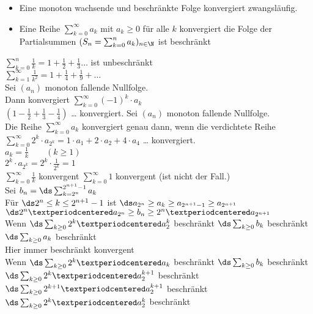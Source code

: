 
%
\begin{itemize}
    \item{Eine monoton wachsende und beschränkte Folge konvergiert zwangsläufig.}
    \item{Eine Reihe $\sum_{k=0}^{∞} a_k$ mit $a_k \geq 0$ für alle $k$ konvergiert \equ die Folge der Partialsummen $(S_n = \sum_{k=0}^{n} a_k)_{n \in \N}$ ist beschränkt}
\end{itemize}
%
\bsp
    $\sum_{k=0}^{n} \frac{1}{k} = 1 + \frac{1}{2} + \frac{1}{3} …$ ist unbeschränkt\\
\bsp
    $\sum_{k=1}^{\infty} \frac{1}{k^2} = 1 + \frac{1}{4} + \frac{1}{9}+…$\\
    Sei $(a_n)$ monoton fallende Nullfolge.\\
    Dann konvergiert $\sum_{k=0}^{∞} (-1)^k \cdot a_k$\\
\bsp
    $(1 - \frac{1}{2} + \frac{1}{3} - \frac{1}{4})$ … konvergiert.
Sei $(a_n)$ monoton fallende Nullfolge.\\
Die Reihe $\sum_{k=0}^{\infty} a_k$ konvergiert genau dann, wenn die verdichtete Reihe $\sum_{k=0}^{\infty} 2^k \cdot a_{2^k} = 1 · a_1 + 2 · a_2 + 4 \cdot a_4$ … konvergiert.\\
%
\bsp
    $a_k = \frac{1}{k}\qquad (k \geq 1)$\\
    $2^k \cdot a_{2^k} = 2^k \cdot \frac{1}{2^k} = 1$\\
%
$\sum_{k=0}^\infty \frac{1}{k}$ konvergent \equ $\sum_{k=0}^\infty 1$ konvergent (ist nicht der Fall.)\\
\bew
Sei $b_n = \ds\sum_{k=2^n}^{2^{n+1}-1} a_k$\\
Für $\ds 2^n \leq k \leq 2^{n+1} - 1$ ist $\ds a_{2^n} \geq a_{k} \geq a_{2^{n+1} - 1} \geq a_{2^{n+1}}$ \Rarr $\ds 2^n · a_{2^n} \geq b_n \geq  2^n · a_{2^{n+1}}$\\
Wenn $\ds \sum_{k \geq 0} 2^k · a_2^k$ beschränkt \Rarr $\ds \sum_{k \geq 0} b_k$ beschränkt \Rarr $\ds \sum_{k \geq 0} a_k$ beschränkt\\
Hier immer beschränkt \equ konvergent\\
Wenn $\ds \sum_{k \geq 0} 2^k · a_k$ beschränkt \Rarr $\ds \sum_{k \geq 0} b_k$ beschränkt \Rarr $\ds \sum_{k \geq 0} 2^{k} · a_2^{k+1}$ beschränkt \equ $\ds \sum_{k \geq 0} 2^{k+1} · a_2^{k+1}$ beschränkt \equ $\ds \sum_{k \geq 0} 2^{k} · a_2^{k}$ beschränkt\\
